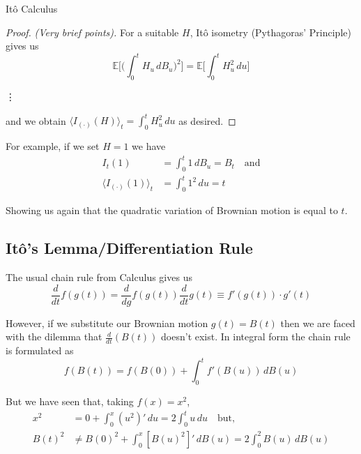 \documentclass[12pt]{article}
\newenvironment{theorem}[2][Theorem:]{\begin{trivlist} %
\item[\hskip \labelsep {\bfseries #1}\hskip \labelsep {\bfseries #2.}]}{\end{trivlist}}
\newlength\tindent
\renewcommand{\indent}{\hspace*{\tindent}}
\begin{document}
\begin{section}{It\^{o} Calculus}
\begin{theorem}{For an It\^{o} $I_t(H) = \int^t_0 H_u\,dB_u$, the quadratic variation is $\langle I_{(\cdot)}(H)\rangle_t = \int^t_0 H^2_u\,du$} \hfill
\begin{proof} {\em (Very brief points).} For a suitable $H$, It\^{o} isometry (Pythagoras' Principle) gives us
\begin{equation*}
	\mathbb E\Bigg[\Big(\int^t_0 H_u\,dB_u\Big)^2\Bigg] = \mathbb E\Bigg[\int^t_0 H^2_u\,du\Bigg]
\end{equation*}

\vdots

and we obtain $\langle I_{(\cdot)}(H) \rangle_t = \int^t_0 H_u^2\,du$ as desired.
\end{proof}
\end{theorem}

For example, if we set $H = 1$ we have
\begin{align*}
	I_t(1) &= \int^t_0 1\,dB_u = B_t \quad \text{and} \\
	\langle I_{(\cdot)}(1)\rangle_t &= \int^t_0 1^2\,du = t
\end{align*}

Showing us again that the quadratic variation of Brownian motion is equal to $t$.

\subsection{It\^{o}'s Lemma/Differentiation Rule}

The usual chain rule from Calculus gives us
\begin{equation*}
	\frac{d}{dt}f(g(t)) = \frac{d}{dg}f(g(t))\frac{d}{dt}g(t) \equiv f'(g(t))\cdot g'(t)
\end{equation*}

\indent However, if we substitute our Brownian motion $g(t) = B(t)$ then we are faced with the dilemma that $\frac{d}{dt}(B(t))$ doesn't exist. In integral form the chain rule is formulated as
\begin{equation*}
	f(B(t)) = f(B(0)) + \int^t_0 f'(B(u))\,dB(u)
\end{equation*}

But we have seen that, taking $f(x) = x^2$,
\begin{align*}
	x^2 &= 0 + \int^x_0 (u^2)'\,du = 2\int^t_0 u\,du \quad \text{but,} \\
	B(t)^2 &\neq B(0)^2 + \int^x_0 [B(u)^2]'\,dB(u) = 2\int^2_0 B(u)\,dB(u)
\end{align*}


\end{section}
\end{document}
